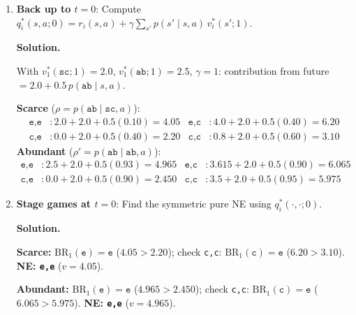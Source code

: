 \documentclass[12pt]{article}
\newenvironment{solution}{%
  \ifshowsolutions\begin{solutionbox}\noindent\textbf{\color{blue!70!black}Solution.}\quad\fi
  \ifshowsolutions\else\expandafter\comment\fi
}{%
  \ifshowsolutions\end{solutionbox}\fi
  \ifshowsolutions\else\expandafter\endcomment\fi
}
\begin{document}
\begin{enumerate}
\begin{enumerate}
\begin{solution}
    \textbf{Abundant.}
    \begin{center}\begin{tabular}{|c|c|c|}\hline & \texttt{e} & \texttt{c}\\\hline \texttt{e} & $(2.5,2.5)$ & $(3.615,0.0)$\\\hline \texttt{c} & $(0.0,3.615)$ & $(3.5,3.5)$\\\hline\end{tabular}\end{center}
    $\mathrm{BR}_1(\texttt{e})=\texttt{e}$; check \texttt{c,c}: $\mathrm{BR}_1(\texttt{c})=\texttt{e}$ ($3.615>3.5$). \textbf{NE: \texttt{e,e}.} $v_i^*(\texttt{abundant};1)=2.5$.
  \end{solution}

  \item \textbf{Back up to $t=0$}: Compute $q_i^*(s,a;0)=r_i(s,a)+\gamma\sum_{s'}p(s'\mid s,a)\,v_i^*(s';1)$.

  \begin{solution}
    With $v_1^*(\texttt{sc};1)=2.0$, $v_1^*(\texttt{ab};1)=2.5$, $\gamma=1$: contribution from future $= 2.0 + 0.5\,p(\texttt{ab}\mid s,a)$.

    \textbf{Scarce} ($\rho=p(\texttt{ab}\mid\texttt{sc},a)$):
    \begin{align*}
      \texttt{e,e}&: 2.0+2.0+0.5(0.10)=4.05 & \texttt{e,c}&: 4.0+2.0+0.5(0.40)=6.20\\
      \texttt{c,e}&: 0.0+2.0+0.5(0.40)=2.20 & \texttt{c,c}&: 0.8+2.0+0.5(0.60)=3.10
    \end{align*}
    \textbf{Abundant} ($\rho'=p(\texttt{ab}\mid\texttt{ab},a)$):
    \begin{align*}
      \texttt{e,e}&: 2.5+2.0+0.5(0.93)=4.965 & \texttt{e,c}&: 3.615+2.0+0.5(0.90)=6.065\\
      \texttt{c,e}&: 0.0+2.0+0.5(0.90)=2.450 & \texttt{c,c}&: 3.5+2.0+0.5(0.95)=5.975
    \end{align*}
  \end{solution}

  \item \textbf{Stage games at $t=0$}: Find the symmetric pure NE using $q_i^*(\cdot,\cdot;0)$.

  \begin{solution}
    \textbf{Scarce:} $\mathrm{BR}_1(\texttt{e})=\texttt{e}$ ($4.05>2.20$); check \texttt{c,c}: $\mathrm{BR}_1(\texttt{c})=\texttt{e}$ ($6.20>3.10$). \textbf{NE: \texttt{e,e}} ($v=4.05$).

    \textbf{Abundant:} $\mathrm{BR}_1(\texttt{e})=\texttt{e}$ ($4.965>2.450$); check \texttt{c,c}: $\mathrm{BR}_1(\texttt{c})=\texttt{e}$ ($6.065>5.975$). \textbf{NE: \texttt{e,e}} ($v=4.965$).
  \end{solution}


\end{enumerate}
\end{enumerate}
\end{document}
